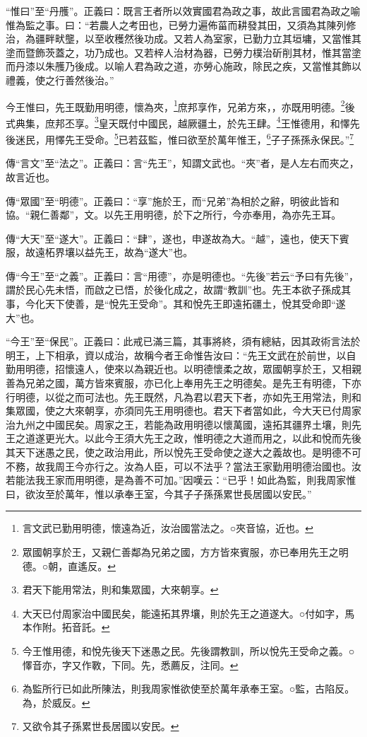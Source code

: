 {\noindent\shu{}\fzkt “惟曰”至“丹雘”。正義曰：既言王者所以效實國君為政之事，故此言國君為政之喻惟為監之事。曰：“若農人之考田也，已勞力遍佈菑而耕發其田，又須為其陳列修治，為疆畔畎壟，以至收穫然後功成。又若人為室家，已勤力立其垣墉，又當惟其塗而暨飾茨蓋之，功乃成也。又若梓人治材為器，已勞力樸治斫削其材，惟其當塗而丹漆以朱雘乃後成。以喻人君為政之道，亦勞心施政，除民之疾，又當惟其飾以禮義，使之行善然後治。” \par}

今王惟曰，先王既勤用明德，懷為夾，\footnote{言文武已勤用明德，懷遠為近，汝治國當法之。○夾音協，近也。}庶邦享作，兄弟方來，，亦既用明德。\footnote{眾國朝享於王，又親仁善鄰為兄弟之國，方方皆來賓服，亦已奉用先王之明德。○朝，直遙反。}後式典集，庶邦丕享。\footnote{君天下能用常法，則和集眾國，大來朝享。}皇天既付中國民，越厥疆土，於先王肆。\footnote{大天已付周家治中國民矣，能遠拓其界壤，則於先王之道遂大。○付如字，馬本作附。拓音託。}王惟德用，和懌先後迷民，用懌先王受命。\footnote{今王惟用德，和悅先後天下迷愚之民。先後謂教訓，所以悅先王受命之義。○懌音亦，字又作斁，下同。先，悉薦反，注同。}已若茲監，惟曰欲至於萬年惟王，\footnote{為監所行已如此所陳法，則我周家惟欲使至於萬年承奉王室。○監，古陷反。為，於威反。}子子孫孫永保民。”\footnote{又欲令其子孫累世長居國以安民。}

{\noindent\zhuan{}\fzbyks 傳“言文”至“法之”。正義曰：言“先王”，知謂文武也。“夾”者，是人左右而夾之，故言近也。 \par}

{\noindent\zhuan{}\fzbyks 傳“眾國”至“明德”。正義曰：“享”施於王，而“兄弟”為相於之辭，明彼此皆和協。“親仁善鄰”，文。以先王用明德，於下之所行，今亦奉用，為亦先王耳。 \par}

{\noindent\zhuan{}\fzbyks 傳“大天”至“遂大”。正義曰：“肆”，遂也，申遂故為大。“越”，遠也，使天下賓服，故遠柘界壤以益先王，故為“遂大”也。 \par}

{\noindent\zhuan{}\fzbyks 傳“今王”至“之義”。正義曰：言“用德”，亦是明德也。“先後”若云“予曰有先後”，謂於民心先未悟，而啟之已悟，於後化成之，故謂“教訓”也。先王本欲子孫成其事，今化天下使善，是“悅先王受命”。其和悅先王即遠拓疆土，悅其受命即“遂大”也。 \par}

{\noindent\shu{}\fzkt “今王”至“保民”。正義曰：此戒已滿三篇，其事將終，須有總結，因其政術言法於明王，上下相承，資以成治，故稱今者王命惟告汝曰：“先王文武在於前世，以自勤用明德，招懷遠人，使來以為親近也。以明德懷柔之故，眾國朝享於王，又相親善為兄弟之國，萬方皆來賓服，亦已化上奉用先王之明德矣。是先王有明德，下亦行明德，以從之而可法也。先王既然，凡為君以君天下者，亦如先王用常法，則和集眾國，使之大來朝享，亦須同先王用明德也。君天下者當如此，今大天已付周家治九州之中國民矣。周家之王，若能為政用明德以懷萬國，遠拓其疆界土壤，則先王之道遂更光大。以此今王須大先王之政，惟明德之大道而用之，以此和悅而先後其天下迷愚之民，使之政治用此，所以悅先王受命使之遂大之義故也。是明德不可不務，故我周王今亦行之。汝為人臣，可以不法乎？當法王家勤用明德治國也。汝若能法我王家而用明德，是為善不可加。”因嘆云：“已乎！如此為監，則我周家惟曰，欲汝至於萬年，惟以承奉王室，今其子子孫孫累世長居國以安民。” \par}

